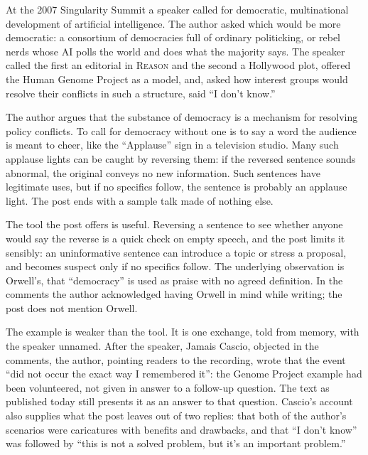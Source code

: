 \begin{afterword}
\summaryhead

At the 2007 Singularity Summit a speaker called for democratic, multinational development of artificial intelligence. The author asked which would be more democratic: a consortium of democracies full of ordinary politicking, or rebel nerds whose AI polls the world and does what the majority says. The speaker called the first an editorial in \textsc{Reason} and the second a Hollywood plot, offered the Human Genome Project as a model, and, asked how interest groups would resolve their conflicts in such a structure, said ``I don't know.''

The author argues that the substance of democracy is a mechanism for resolving policy conflicts. To call for democracy without one is to say a word the audience is meant to cheer, like the ``Applause'' sign in a television studio. Many such applause lights can be caught by reversing them: if the reversed sentence sounds abnormal, the original conveys no new information. Such sentences have legitimate uses, but if no specifics follow, the sentence is probably an applause light. The post ends with a sample talk made of nothing else.

\responsehead

The tool the post offers is useful. Reversing a sentence to see whether anyone would say the reverse is a quick check on empty speech, and the post limits it sensibly: an uninformative sentence can introduce a topic or stress a proposal, and becomes suspect only if no specifics follow. The underlying observation is Orwell's, that ``democracy'' is used as praise with no agreed definition. In the comments the author acknowledged having Orwell in mind while writing; the post does not mention Orwell.

The example is weaker than the tool. It is one exchange, told from memory, with the speaker unnamed. After the speaker, Jamais Cascio, objected in the comments, the author, pointing readers to the recording, wrote that the event ``did not occur the exact way I remembered it'': the Genome Project example had been volunteered, not given in answer to a follow-up question. The text as published today still presents it as an answer to that question. Cascio's account also supplies what the post leaves out of two replies: that both of the author's scenarios were caricatures with benefits and drawbacks, and that ``I don't know'' was followed by ``this is not a solved problem, but it's an important problem.''


\end{afterword}

